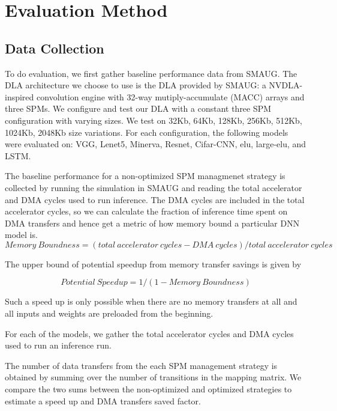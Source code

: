 \chapter{Evaluation Method} %

\label{Chapter5} %

\section{Data Collection}
To do evaluation, we first gather baseline performance data from SMAUG. The DLA architecture we
choose to use is the DLA provided by SMAUG: a NVDLA-inspired convolution engine with
32-way mutiply-accumulate (MACC) arrays and three SPMs. We configure and test our DLA with
a constant three SPM configuration with varying sizes. We test on 32Kb, 64Kb, 128Kb, 256Kb,
512Kb, 1024Kb, 2048Kb size variations. For each configuration, the following models were
evaluated on: VGG, Lenet5, Minerva, Resnet, Cifar-CNN, elu, large-elu, and LSTM.

The baseline performance for a non-optimized SPM managmenet strategy is
collected by running the simulation in SMAUG and reading the total accelerator
and DMA cycles used to run inference. The DMA cycles are included in the total accelerator cycles, so we can calculate the fraction of inference time spent on DMA transfers and hence get a 
metric of how memory bound a particular DNN model is.
\[
    Memory\ Boundness = (total\ accelerator\ cycles - DMA\ cycles) / total\ accelerator\ cycles
\]

The upper bound of potential speedup from memory transfer savings is given by

\[
    Potential\ Speedup = 1/(1 - Memory\ Boundness)
\]

Such a speed up is only possible when there are no memory transfers at all and all
inputs and weights are preloaded from the beginning.

For each of the models, we gather the total accelerator cycles and DMA cycles
used to run an inference run.

The number of data transfers from the each SPM management strategy is obtained
by summing over the number of transitions in the mapping matrix. We compare the
two sums between the non-optimized and optimized strategies to estimate a speed
up and DMA transfers saved factor.

